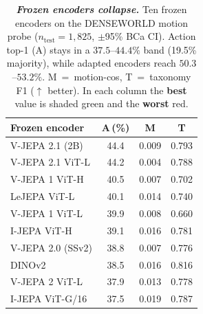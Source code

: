 \begin{table}[t]
\centering
\caption{\textbf{\emph{Frozen encoders collapse.}} Ten frozen encoders on the DENSEWORLD motion probe ($n_{\mathrm{test}}=1{,}825$, $\pm$95\% BCa CI). Action top-1 (A) stays in a $37.5$--$44.4\%$ band (19.5\% majority), while adapted encoders reach $50.3$--$53.2\%$. M~=~motion-cos, T~=~taxonomy F1 ($\uparrow$ better). In each column the \textbf{best} value is shaded green and the \textbf{worst} red.}
\label{tab:frozen_scorecard_full}
\footnotesize\bfseries
\setlength{\tabcolsep}{16pt}
\renewcommand{\arraystretch}{1.18}
\begin{tabular}{@{}lccc@{}}
\toprule
Frozen encoder & A\,(\%) & M & T \\
\midrule
V-JEPA 2.1 (2B)   & \cellcolor{green!35}44.4 & 0.009 & 0.793 \\
V-JEPA 2.1 ViT-L  & 44.2 & \cellcolor{red!35}0.004 & 0.788 \\
V-JEPA 1 ViT-H    & 40.5 & 0.007 & 0.702 \\
LeJEPA ViT-L      & 40.1 & 0.014 & 0.740 \\
V-JEPA 1 ViT-L    & 39.9 & 0.008 & \cellcolor{red!35}0.660 \\
I-JEPA ViT-H      & 39.1 & 0.016 & 0.781 \\
V-JEPA 2.0 (SSv2) & 38.8 & 0.007 & 0.776 \\
DINOv2            & 38.5 & 0.016 & \cellcolor{green!35}0.816 \\
V-JEPA 2 ViT-L    & 37.9 & 0.013 & 0.778 \\
I-JEPA ViT-G/16   & \cellcolor{red!35}37.5 & \cellcolor{green!35}0.019 & 0.787 \\
\bottomrule
\end{tabular}
\end{table}

